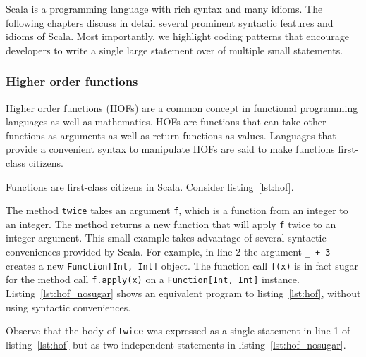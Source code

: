 Scala is a programming language with rich syntax and many idioms.
The following chapters discuss in detail several prominent syntactic features and idioms of Scala.
Most importantly, we highlight coding patterns that encourage developers to write a single large statement over of multiple small statements.

\subsubsection{Higher order functions}
Higher order functions (HOFs) are a common concept in functional programming languages as well as mathematics.
HOFs are functions that can take other functions as arguments as well as return functions as values.
Languages that provide a convenient syntax to manipulate HOFs are said to make functions first-class citizens.

Functions are first-class citizens in Scala.
Consider listing~\ref{lst:hof}.

The method \texttt{twice} takes an argument \texttt{f}, which is a function from an integer to an integer.
The method returns a new function that will apply \texttt{f} twice to an integer argument.
This small example takes advantage of several syntactic conveniences provided by Scala.
For example, in line 2 the argument \texttt{\_ + 3} creates a new \texttt{Function[Int, Int]} object.
The function call \texttt{f(x)} is in fact sugar for the method call \texttt{f.apply(x)} on a \texttt{Function[Int, Int]} instance.
Listing~\ref{lst:hof_nosugar} shows an equivalent program to listing~\ref{lst:hof}, without using syntactic conveniences.

Observe that the body of \texttt{twice} was expressed as a single statement in line 1 of listing~\ref{lst:hof} but as two independent statements in listing~\ref{lst:hof_nosugar}.

